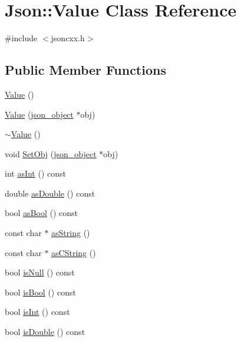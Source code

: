 \hypertarget{class_json_1_1_value}{}\section{Json\+:\+:Value Class Reference}
\label{class_json_1_1_value}


{\ttfamily \#include $<$jsoncxx.\+h$>$}

\subsection*{Public Member Functions}
\begin{DoxyCompactItemize}
\item 
\hyperlink{class_json_1_1_value_a3dd8ad60321f45f8d51c864e3a96a848}{Value} ()
\item 
\hyperlink{class_json_1_1_value_ad1deffd768f7603cc7d4c5eccf03916d}{Value} (\hyperlink{structjson__object}{json\+\_\+object} $\ast$obj)
\item 
\hyperlink{class_json_1_1_value_a287dea48da3912d02756735bf677b27b}{$\sim$\+Value} ()
\item 
void \hyperlink{class_json_1_1_value_a03430deb0b2a143e0fe2d743cceabab3}{Set\+Obj} (\hyperlink{structjson__object}{json\+\_\+object} $\ast$obj)
\item 
int \hyperlink{class_json_1_1_value_a2dd28c1e9957927b2c4601eeb2fb56e1}{as\+Int} () const
\item 
double \hyperlink{class_json_1_1_value_afd24002a18aef907ad746b1cb9eda0a2}{as\+Double} () const
\item 
bool \hyperlink{class_json_1_1_value_ab693fb7b9b1595bb0adc49658bbf780d}{as\+Bool} () const
\item 
const char $\ast$ \hyperlink{class_json_1_1_value_a42268ca4dfc386562bee8707045b2263}{as\+String} ()
\item 
const char $\ast$ \hyperlink{class_json_1_1_value_a6733eb0c71d6e2a59fea9f96ec28bf3a}{as\+C\+String} ()
\item 
bool \hyperlink{class_json_1_1_value_abde4070e21e46dc4f8203f66582cb19f}{is\+Null} () const
\item 
bool \hyperlink{class_json_1_1_value_ab1f02651cb89d0f18b63a036959391ba}{is\+Bool} () const
\item 
bool \hyperlink{class_json_1_1_value_aff51d8b52979ca06cf9d909accd5f695}{is\+Int} () const
\item 
bool \hyperlink{class_json_1_1_value_a4a2e2a790e19a1c09fc5dd12d7ad47b5}{is\+Double} () const
\item 

\end{DoxyCompactItemize}
